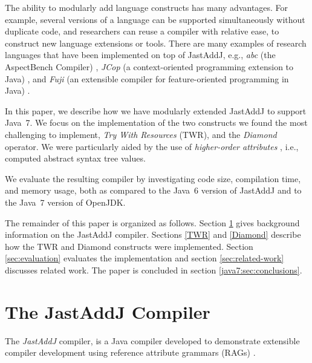 {The ability to modularly add language constructs has many advantages. For
example, several versions of a language can be supported simultaneously without
duplicate code, and researchers can reuse a compiler with relative ease, to construct new
language extensions or tools. There are many examples of research languages
that have been implemented on top of JastAddJ, e.g., \emph{abc} (the
AspectBench Compiler) \cite{abc08}, \emph{JCop} (a context-oriented programming
extension to Java) \cite{jcop10}, and \emph{Fuji} (an extensible compiler for
feature-oriented programming in Java) \cite{fuji12}.

In this paper, we describe how we have modularly extended JastAddJ to support
Java~7. We focus on the implementation of the two constructs we found the most
challenging to implement, \emph{Try With Resources} (TWR), and the
\emph{Diamond} operator. We were particularly aided by the use of
\emph{higher-order attributes} \cite{vogt1989higher}, i.e., computed abstract
syntax tree values.


We evaluate the resulting compiler by investigating code size, compilation
time, and memory usage, both as compared to the Java~6 version of JastAddJ and
to the Java~7 version of OpenJDK.

The remainder of this paper is organized as follows. Section \ref{JastAddJ}
gives background information on the JastAddJ compiler. Sections \ref{TWR} and
\ref{Diamond} describe how the TWR and Diamond constructs were implemented. Section \ref{sec:evaluation} evaluates the
implementation and section \ref{sec:related-work} discusses related work. The paper
is concluded in section \ref{java7:sec:conclusions}.

\section{The JastAddJ Compiler}
\label{JastAddJ}

The \emph{JastAddJ} compiler, \cite{jastaddj} is a Java compiler developed to demonstrate
extensible compiler development using reference attribute grammars (RAGs) \cite{DBLP:journals/informaticaSI/Hedin00}.

}
